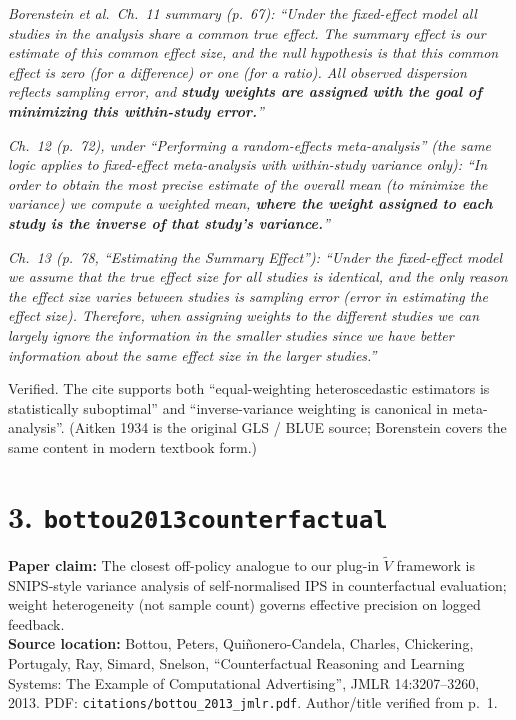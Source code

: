 \documentclass[11pt]{article}
\newcommand{\paperclaim}[1]{\textbf{Paper claim:} #1}
\newcommand{\source}[1]{\textbf{Source location:} #1}
\newcommand{\quoted}[1]{\begin{tcolorbox}\textit{#1}\end{tcolorbox}}
\begin{document}
\quoted{Borenstein et al.\ Ch.~11 summary (p.~67): ``Under the fixed-effect
model all studies in the analysis share a common true effect. The summary
effect is our estimate of this common effect size, and the null hypothesis
is that this common effect is zero (for a difference) or one (for a
ratio). All observed dispersion reflects sampling error, and \textbf{study
weights are assigned with the goal of minimizing this within-study error.}''}

\quoted{Ch.~12 (p.~72), under ``Performing a random-effects meta-analysis''
(the same logic applies to fixed-effect meta-analysis with within-study
variance only): ``In order to obtain the most precise estimate of the
overall mean (to minimize the variance) we compute a weighted mean,
\textbf{where the weight assigned to each study is the inverse of that
study's variance.}''}

\quoted{Ch.~13 (p.~78, ``Estimating the Summary Effect''): ``Under the
fixed-effect model we assume that the true effect size for all studies is
identical, and the only reason the effect size varies between studies is
sampling error (error in estimating the effect size). Therefore, when
assigning weights to the different studies we can largely ignore the
information in the smaller studies since we have better information about
the same effect size in the larger studies.''}

\noindent Verified. The cite supports both ``equal-weighting heteroscedastic
estimators is statistically suboptimal'' and ``inverse-variance weighting is
canonical in meta-analysis''. (Aitken 1934 is the original GLS / BLUE
source; Borenstein covers the same content in modern textbook form.)

\bigskip

\section*{3. \texttt{bottou2013counterfactual}}
\paperclaim{The closest off-policy analogue to our plug-in $\widetilde V$
framework is SNIPS-style variance analysis of self-normalised IPS in
counterfactual evaluation; weight heterogeneity (not sample count) governs
effective precision on logged feedback.}\\
\source{Bottou, Peters, Quiñonero-Candela, Charles, Chickering, Portugaly,
Ray, Simard, Snelson, ``Counterfactual Reasoning and Learning Systems:
The Example of Computational Advertising'', JMLR 14:3207--3260, 2013.
PDF: \texttt{citations/bottou\_2013\_jmlr.pdf}. Author/title verified
from p.~1.}
\end{document}
